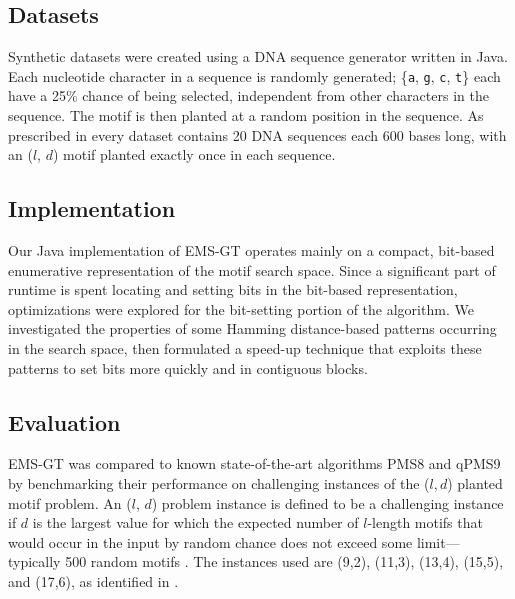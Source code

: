 \documentclass{acm_proc_article-sp}
\begin{document}
	\subsection{Datasets}
		Synthetic datasets were created using a DNA sequence generator written in Java. Each nucleotide character in a sequence is randomly generated; \{\texttt{a}, \texttt{g}, \texttt{c}, \texttt{t}\} each have a 25\% chance of being selected, independent from other characters in the sequence. The motif is then planted at a random position in the sequence. As prescribed in \cite{pevzner2000combinatorial} every dataset contains 20 DNA sequences each 600 bases long, with an ($l$, $d$) motif planted exactly once in each sequence.

	\subsection{Implementation}
		Our Java implementation of EMS-GT operates mainly on a compact, bit-based enumerative representation of the motif search space. Since a significant part of runtime is spent locating and setting bits in the bit-based representation, optimizations were explored for the bit-setting portion of the algorithm. We investigated the properties of some Hamming distance-based patterns occurring in the search space, then formulated a speed-up technique that exploits these patterns to set bits more quickly and in contiguous blocks.

	\subsection{Evaluation}
		EMS-GT was compared to known state-of-the-art algorithms PMS8 and qPMS9 by benchmarking their performance on challenging instances of the ($l, d$) planted motif problem. An ($l$, $d$) problem instance is defined to be a challenging instance if $d$ is the largest value for which the expected number of $l$-length motifs that would occur in the input by random chance does not exceed some limit---typically 500 random motifs \cite{pms2015}. The instances used are (9,2), (11,3), (13,4), (15,5), and (17,6), as identified in \cite{pms2015,pms2007}. 
		\bigskip
\end{document}
